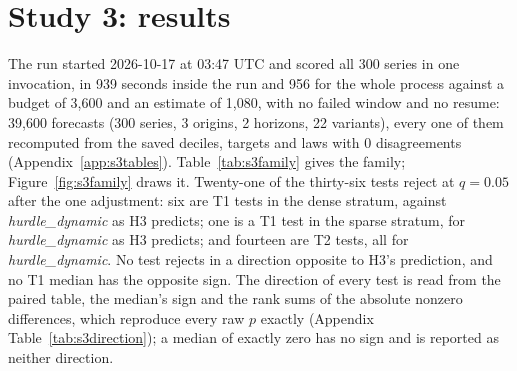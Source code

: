 \providecommand{\qs}{QScore9}
\providecommand{\hc}{\texttt{hurdle\_count\_28}}

\section{Study 3: results}
\label{sec:s3results}

The run started 2026-10-17 at 03:47 UTC and scored all 300 series in one invocation, in 939 seconds inside
the run and 956 for the whole process against a budget of 3,600 and an estimate of 1,080, with no failed
window and no resume: 39,600 forecasts (300 series, 3 origins, 2 horizons, 22 variants), every one of them
recomputed from the saved deciles, targets and laws with 0 disagreements (Appendix~\ref{app:s3tables}).
Table~\ref{tab:s3family} gives the family; Figure~\ref{fig:s3family} draws it. Twenty-one of the
thirty-six tests reject at $q = 0.05$ after the one adjustment: six are T1 tests in the dense stratum,
against \emph{hurdle\_dynamic} as H3 predicts; one is a T1 test in the sparse stratum, for
\emph{hurdle\_dynamic} as H3 predicts; and fourteen are T2 tests, all for \emph{hurdle\_dynamic}. No test
rejects in a direction opposite to H3's prediction, and no T1 median has the opposite sign. The direction of
every test is read from the paired table, the median's sign and the rank sums of the absolute nonzero
differences, which reproduce every raw $p$ exactly (Appendix Table~\ref{tab:s3direction}); a median of
exactly zero has no sign and is reported as neither direction.


